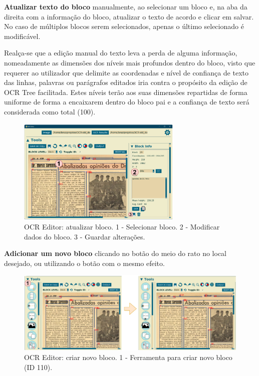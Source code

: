 \textbf{Atualizar texto do bloco} manualmente, ao selecionar um bloco e, na aba da direita com a informação do bloco, atualizar o texto de acordo e clicar em salvar. No caso de múltiplos blocos serem selecionados, apenas o último selecionado é modificável.

Realça-se que a edição manual do texto leva a perda de alguma informação, nomeadamente as dimensões dos níveis mais profundos dentro do bloco, visto que requerer ao utilizador que delimite as coordenadas e nível de confiança de texto das linhas, palavras ou parágrafos editados iria contra o propósito da edição de OCR Tree facilitada. Estes níveis terão aos suas dimensões repartidas de forma uniforme de forma a encaixarem dentro do bloco pai e a confiança de texto será considerada como total (100).

\begin{figure}[H]
	\centering
	\includegraphics[width=0.7\textwidth]{images/ilustracoes/ocr_editor_update.png}
	\caption{OCR Editor: atualizar bloco. 1 - Selecionar bloco. 2 - Modificar dados do bloco. 3 - Guardar alterações.}
	\label{fig:ocr_editor_update}
\end{figure}

\textbf{Adicionar um novo bloco} clicando no botão do meio do rato no local desejado, ou utilizando o botão com o mesmo efeito.

\begin{figure}[H]
	\centering
	\includegraphics[width=1\textwidth]{images/ilustracoes/ocr_editor_new_block.png}
	\caption{OCR Editor: criar novo bloco. 1 - Ferramenta para criar novo bloco (ID 110).}
	\label{fig:ocr_editor_new_block}
\end{figure}


